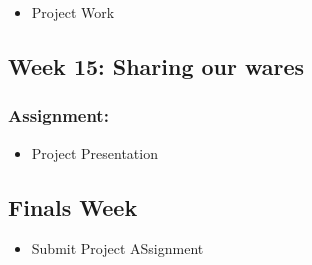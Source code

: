 \documentclass[]{article}
\begin{document}
\begin{itemize}
\itemsep1pt\parskip0pt
\item
  Project Work
\end{itemize}

\subsection{Week 15: Sharing our wares}\label{week-15-sharing-our-wares}

\subsubsection{Assignment:}\label{assignment-13}

\begin{itemize}
\itemsep1pt\parskip0pt
\item
  Project Presentation
\end{itemize}

\subsection{Finals Week}\label{finals-week}

\begin{itemize}
\itemsep1pt\parskip0pt
\item
  Submit Project ASsignment
\end{itemize}
\end{document}

